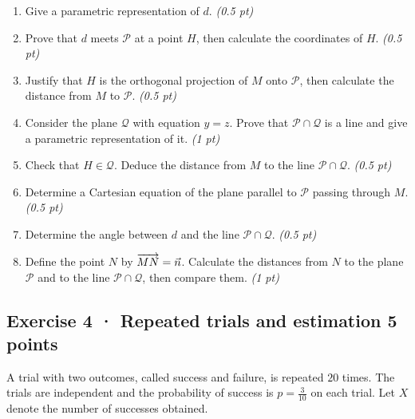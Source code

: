 \begin{enumerate}

\item Give a parametric representation of $d$. \hfill\textit{(0.5 pt)}

\item Prove that $d$ meets $\mathcal P$ at a point $H$, then calculate the coordinates of $H$. \hfill\textit{(0.5 pt)}

\item Justify that $H$ is the orthogonal projection of $M$ onto $\mathcal P$, then calculate the distance from $M$ to $\mathcal P$. \hfill\textit{(0.5 pt)}

\item Consider the plane $\mathcal Q$ with equation $y=z$. Prove that $\mathcal P\cap\mathcal Q$ is a line and give a parametric representation of it. \hfill\textit{(1 pt)}

\item Check that $H\in\mathcal Q$. Deduce the distance from $M$ to the line $\mathcal P\cap\mathcal Q$. \hfill\textit{(0.5 pt)}

\item Determine a Cartesian equation of the plane parallel to $\mathcal P$ passing through $M$. \hfill\textit{(0.5 pt)}

\item Determine the angle between $d$ and the line $\mathcal P\cap\mathcal Q$. \hfill\textit{(0.5 pt)}

\item Define the point $N$ by $\overrightarrow{MN}=\vec n$. Calculate the distances from $N$ to the plane $\mathcal P$ and to the line $\mathcal P\cap\mathcal Q$, then compare them. \hfill\textit{(1 pt)}

\end{enumerate}

\subsection*{Exercise 4 · Repeated trials and estimation \hfill 5 points}A trial with two outcomes, called success and failure, is repeated $20$ times. The trials are independent and the probability of success is $p=\frac{3}{10}$ on each trial. Let $X$ denote the number of successes obtained.

